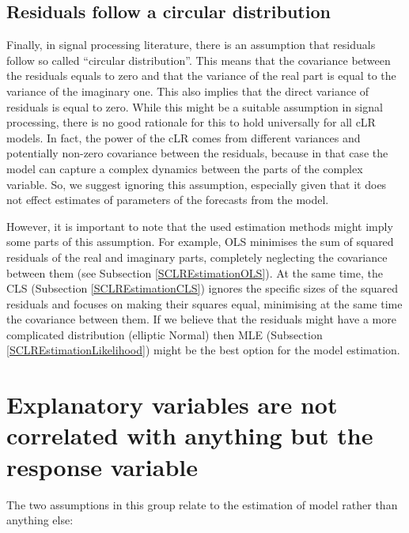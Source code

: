 \documentclass[
]{book}
\begin{document}
\hypertarget{residuals-follow-a-circular-distribution}{%
\subsection{Residuals follow a circular distribution}\label{residuals-follow-a-circular-distribution}}

Finally, in signal processing literature, there is an assumption that residuals follow so called ``circular distribution''. This means that the covariance between the residuals equals to zero and that the variance of the real part is equal to the variance of the imaginary one. This also implies that the direct variance of residuals is equal to zero. While this might be a suitable assumption in signal processing, there is no good rationale for this to hold universally for all cLR models. In fact, the power of the cLR comes from different variances and potentially non-zero covariance between the residuals, because in that case the model can capture a complex dynamics between the parts of the complex variable. So, we suggest ignoring this assumption, especially given that it does not effect estimates of parameters of the forecasts from the model.

However, it is important to note that the used estimation methods might imply some parts of this assumption. For example, OLS minimises the sum of squared residuals of the real and imaginary parts, completely neglecting the covariance between them (see Subsection \ref{SCLREstimationOLS}). At the same time, the CLS (Subsection \ref{SCLREstimationCLS}) ignores the specific sizes of the squared residuals and focuses on making their squares equal, minimising at the same time the covariance between them. If we believe that the residuals might have a more complicated distribution (elliptic Normal) then MLE (Subsection \ref{SCLREstimationLikelihood}) might be the best option for the model estimation.

\hypertarget{explanatory-variables-are-not-correlated-with-anything-but-the-response-variable}{%
\section{Explanatory variables are not correlated with anything but the response variable}\label{explanatory-variables-are-not-correlated-with-anything-but-the-response-variable}}

The two assumptions in this group relate to the estimation of model rather than anything else:
\end{document}
